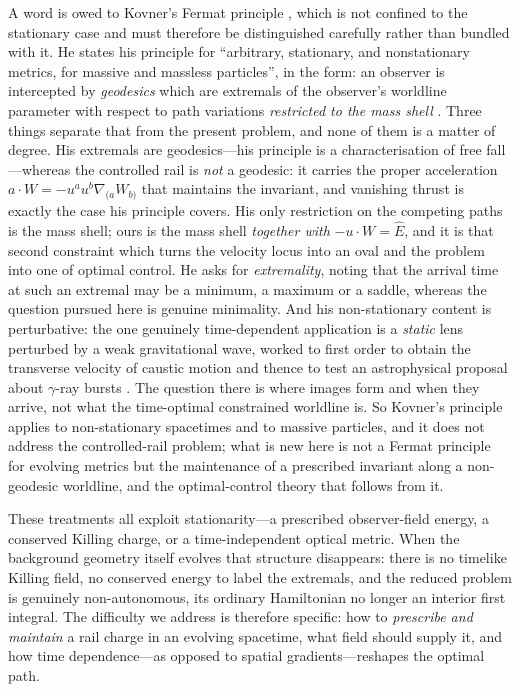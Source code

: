 \documentclass[12pt]{iopart}
\newcommand{\Ehat}{\hat E}
\theoremstyle{plain}
\theoremstyle{definition}
\theoremstyle{plain}
\theoremstyle{remark}
\begin{document}
A word is owed to Kovner's Fermat principle \cite{Kovner1990}, which is not confined
to the stationary case and must therefore be distinguished carefully rather than
bundled with it. He states his principle for ``arbitrary, stationary, and
nonstationary metrics, for massive and massless particles'', in the form: an
observer is intercepted by \emph{geodesics} which are extremals of the observer's
worldline parameter with respect to path variations \emph{restricted to the mass
shell} \cite[Eq.~(2.14)]{Kovner1990}. Three things separate that from the present
problem, and none of them is a matter of degree. His extremals are geodesics---his
principle is a characterisation of free fall---whereas the controlled rail is
\emph{not} a geodesic: it carries the proper acceleration
$a\cdot W=-u^au^b\nabla_{(a}W_{b)}$ that maintains the invariant, and vanishing
thrust is exactly the case his principle covers. His only restriction on the
competing paths is the mass shell; ours is the mass shell \emph{together with}
$-u\cdot W=\Ehat$, and it is that second constraint which turns the velocity locus
into an oval and the problem into one of optimal control. He asks for
\emph{extremality}, noting that the arrival time at such an extremal may be a
minimum, a maximum or a saddle, whereas the question pursued here is genuine
minimality. And his non-stationary content is perturbative: the one genuinely
time-dependent application is a \emph{static} lens perturbed by a weak
gravitational wave, worked to first order to obtain the transverse velocity of
caustic motion and thence to test an astrophysical proposal about $\gamma$-ray
bursts \cite[\S\S IV--V]{Kovner1990}. The question there is where images form and
when they arrive, not what the time-optimal constrained worldline is. So Kovner's principle applies to non-stationary spacetimes and to
massive particles, and it does not address the controlled-rail problem; what is new
here is not a Fermat principle for evolving metrics but the maintenance of a
prescribed invariant along a non-geodesic worldline, and the optimal-control theory
that follows from it.

These treatments all exploit stationarity---a prescribed observer-field energy, a
conserved Killing charge, or a time-independent optical metric. When the background
geometry itself evolves that structure disappears: there is no timelike Killing field, no
conserved energy to label the extremals, and the reduced problem is genuinely
non-autonomous, its ordinary Hamiltonian no longer an interior first integral. The
difficulty we address is therefore specific: how to \emph{prescribe and maintain} a rail
charge in an evolving spacetime, what field should supply it, and how time
dependence---as opposed to spatial gradients---reshapes the optimal path.
\end{document}
